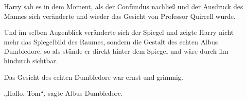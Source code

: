 Harry sah es in dem Moment, als der Confundus nachließ und der Ausdruck des Mannes sich veränderte und wieder das Gesicht von Professor Quirrell wurde.

Und im selben Augenblick veränderte sich der Spiegel und zeigte Harry nicht mehr das Spiegelbild des Raumes, sondern die Gestalt des echten Albus Dumbledore, so als stünde er direkt hinter dem Spiegel und wäre durch ihn hindurch sichtbar.

Das Gesicht des echten Dumbledore war ernst und grimmig.

„Hallo, Tom“, sagte Albus Dumbledore.

